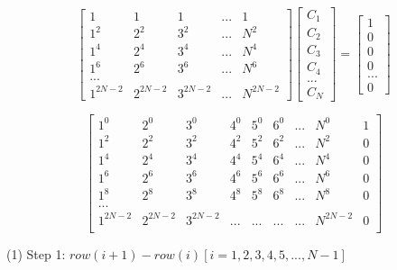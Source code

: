 \documentclass[a1paper]{article}
\begin{document}
\begin{equation}
    \begin{bmatrix}
        1        & 1        & 1        & ... & 1        \\
        1^2      & 2^2      & 3^2      & ... & N^2      \\
        1^4      & 2^4      & 3^4      & ... & N^4      \\
        1^6      & 2^6      & 3^6      & ... & N^6      \\
        ... \\
        1^{2N-2} & 2^{2N-2} & 3^{2N-2} & ... & N^{2N-2}
    \end{bmatrix}
    \begin{bmatrix}
        C_1 \\ C_2 \\ C_3 \\ C_4 \\ ... \\ C_N
    \end{bmatrix}
    =
    \begin{bmatrix}
        1 \\ 0 \\ 0 \\ 0 \\ ... \\ 0
    \end{bmatrix}
    \label{M_F}
\end{equation}

\begin{equation}
    \begin{bmatrix}
        1^0 & 2^0 & 3^0 & 4^0 & 5^0 & 6^0 & ... & N^0 & 1\\
        1^2 & 2^2 & 3^2 & 4^2 & 5^2 & 6^2 & ... & N^2 & 0\\
        1^4 & 2^4 & 3^4 & 4^4 & 5^4 & 6^4 & ... & N^4 & 0\\
        1^6 & 2^6 & 3^6 & 4^6 & 5^6 & 6^6 & ... & N^6 & 0\\
        1^8 & 2^8 & 3^8 & 4^8 & 5^8 & 6^8 & ... & N^8 & 0\\
        ... \\
        1^{2N-2} & 2^{2N-2} & 3^{2N-2} & ... & ...& ...& ... & N^{2N-2} & 0 \\
    \end{bmatrix}
\end{equation}



(1) Step 1:
$row(i+1) - row(i) [i=1,2,3,4,5,...,N-1] $
\end{document}
